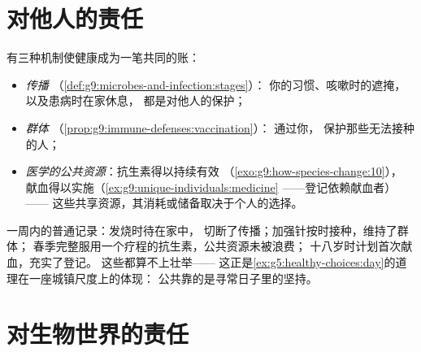 \section{对他人的责任}

\begin{proposition}[健康是共享的机制]\label{prop:g9:our-responsibility:others}
有三种机制使健康成为一笔共同的账：
\begin{itemize}
  \item \emph{传播}
        （\cref{def:g9:microbes-and-infection:stages}）：
        你的习惯、咳嗽时的遮掩，以及患病时在家休息，
        都是对他人的保护；
  \item \emph{群体}
        （\cref{prop:g9:immune-defenses:vaccination}）：
        通过你，
        保护那些无法接种的人；
  \item \emph{医学的公共资源}：抗生素得以持续有效
        （\cref{exo:g9:how-species-change:10}），
        献血得以实施（\cref{ex:g9:unique-individuals:medicine}
        ——登记依赖献血者）——
        这些共享资源，其消耗或储备取决于个人的选择。
\end{itemize}
\end{proposition}
\admitted

\begin{example}[一位青少年的共同账目]\label{ex:g9:our-responsibility:account}
一周内的普通记录：发烧时待在家中，
切断了传播；加强针按时接种，维持了群体；
春季完整服用一个疗程的抗生素，公共资源未被浪费；
十八岁时计划首次献血，充实了登记。
这些都算不上壮举——
这正是\cref{ex:g5:healthy-choices:day}的道理在一座城镇尺度上的体现：
公共靠的是寻常日子里的坚持。
\end{example}

\section{对生物世界的责任}


